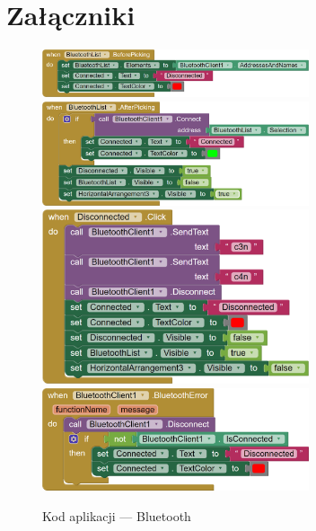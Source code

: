 \documentclass[11pt,titlepage]{article}
\begin{document}
\newpage

\section{Załączniki}

\renewcommand*{\lstlistingname}{Załącznik}
\renewcommand*{\figurename}{Załącznik}
\setcounter{figure}{2}



\newpage

\begin{figure}[p]
    \begin{center}
        \includegraphics[width=0.7\textwidth]{img/app_src/bluetooth/BluetoothListBefore.png}
        \includegraphics[width=0.7\textwidth]{img/app_src/bluetooth/BluetoothListAfter.png}
        \includegraphics[width=0.7\textwidth]{img/app_src/bluetooth/BluetoothDisconnected.png}
        \includegraphics[width=0.7\textwidth]{img/app_src/bluetooth/BluetoothClient.png}
    \end{center}
    \caption{Kod aplikacji — Bluetooth}
    \label{AppBluetooth}
\end{figure}
\end{document}
